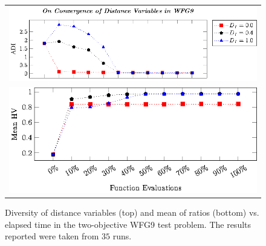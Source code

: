 \begin{figure}[t]
\centering
\begin{tabular}{l}
 \includegraphics[scale=1.25]{images/Diversity_Long_Term_tikz_WFG9-figure0.eps}\\[0cm]%
 \includegraphics[scale=1.25]{images/Diversity_Long_Term_tikz_WFG9-figure1.eps}\\[0cm]%
\end{tabular}
\caption{Diversity of distance variables (top) and mean of \HV{} ratios (bottom) vs. elapsed time in the two-objective WFG9 test problem. The results reported were taken from $35$ runs.}\label{fig:WFG9_Diversity}
\end{figure}



